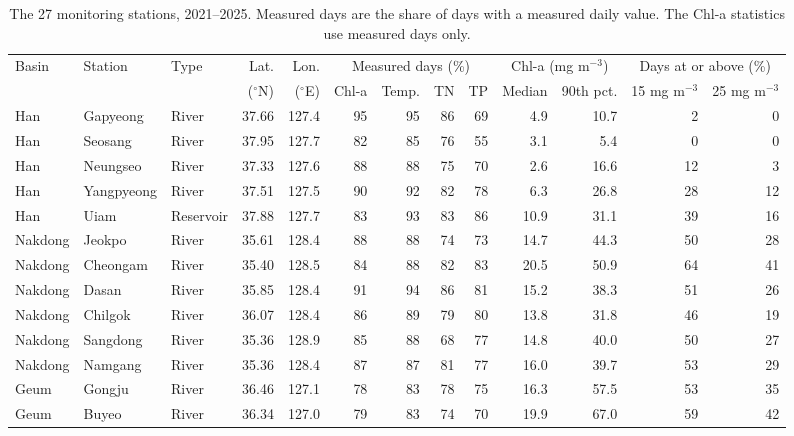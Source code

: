 \begin{table}[tbp]
\centering
\caption{The 27 monitoring stations, 2021--2025. Measured days are the share of days with a measured daily value. The Chl-a statistics use measured days only.}
\label{tab:S_stations}
\footnotesize
\setlength{\tabcolsep}{3.5pt}
\begin{adjustbox}{max width=\textwidth}
\begin{tabular}{lllrrrrrrrrrr}
\toprule
Basin & Station & Type & Lat. & Lon. & \multicolumn{4}{c}{Measured days (\%)} & \multicolumn{2}{c}{Chl-a (mg m$^{-3}$)} & \multicolumn{2}{c}{Days at or above (\%)} \\ \cmidrule(lr){6-9}\cmidrule(lr){10-11}\cmidrule(lr){12-13}
 & & & ($^\circ$N) & ($^\circ$E) & Chl-a & Temp. & TN & TP & Median & 90th pct. & 15 mg m$^{-3}$ & 25 mg m$^{-3}$ \\
\midrule
Han & Gapyeong & River & 37.66 & 127.4 & 95 & 95 & 86 & 69 & 4.9 & 10.7 & 2 & 0 \\
Han & Seosang & River & 37.95 & 127.7 & 82 & 85 & 76 & 55 & 3.1 & 5.4 & 0 & 0 \\
Han & Neungseo & River & 37.33 & 127.6 & 88 & 88 & 75 & 70 & 2.6 & 16.6 & 12 & 3 \\
Han & Yangpyeong & River & 37.51 & 127.5 & 90 & 92 & 82 & 78 & 6.3 & 26.8 & 28 & 12 \\
Han & Uiam & Reservoir & 37.88 & 127.7 & 83 & 93 & 83 & 86 & 10.9 & 31.1 & 39 & 16 \\
\midrule
Nakdong & Jeokpo & River & 35.61 & 128.4 & 88 & 88 & 74 & 73 & 14.7 & 44.3 & 50 & 28 \\
Nakdong & Cheongam & River & 35.40 & 128.5 & 84 & 88 & 82 & 83 & 20.5 & 50.9 & 64 & 41 \\
Nakdong & Dasan & River & 35.85 & 128.4 & 91 & 94 & 86 & 81 & 15.2 & 38.3 & 51 & 26 \\
Nakdong & Chilgok & River & 36.07 & 128.4 & 86 & 89 & 79 & 80 & 13.8 & 31.8 & 46 & 19 \\
Nakdong & Sangdong & River & 35.36 & 128.9 & 85 & 88 & 68 & 77 & 14.8 & 40.0 & 50 & 27 \\
Nakdong & Namgang & River & 35.36 & 128.4 & 87 & 87 & 81 & 77 & 16.0 & 39.7 & 53 & 29 \\
\midrule
Geum & Gongju & River & 36.46 & 127.1 & 78 & 83 & 78 & 75 & 16.3 & 57.5 & 53 & 35 \\
Geum & Buyeo & River & 36.34 & 127.0 & 79 & 83 & 74 & 70 & 19.9 & 67.0 & 59 & 42 \\

\end{tabular}
\end{adjustbox}
\end{table}
